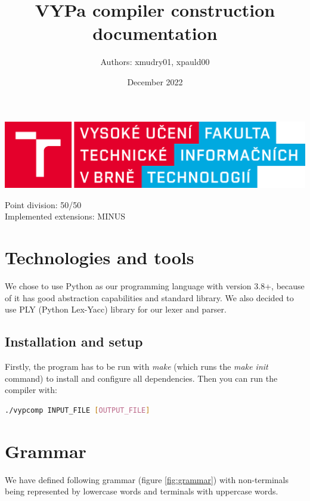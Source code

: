 \documentclass[12pt]{article}
\title{VYPa compiler construction documentation}
\author{Authors: xmudry01, xpauld00}
\date{December 2022}
\begin{document}
\null  %
\nointerlineskip  %
\begin{center}
    \includegraphics[scale=0.1]{images/fit_logo.png}
\end{center}
\vfill
\let\snewpage \newpage
\let\newpage \relax
\maketitle
\begin{center}
Point division: 50/50\\
Implemented extensions: MINUS    
\end{center}
\let \newpage \snewpage
\vfill 
\break %

\section{Technologies and tools}

We chose to use Python as our programming language with version 3.8+, because of it has good abstraction capabilities and standard library. We also decided to use PLY (Python Lex-Yacc) library for our lexer and parser.

\subsection{Installation and setup}

Firstly, the program has to be run with \emph{make} (which runs the \emph{make init} command) to install and configure all dependencies. Then you can run the compiler with:
\\
\begin{lstlisting}[language=bash,basicstyle=\ttfamily\normalsize\bfseries]
./vypcomp INPUT_FILE [OUTPUT_FILE]
\end{lstlisting}


\section{Grammar}
We have defined following grammar (figure \ref{fig:grammar}) with non-terminals being represented by lowercase words and terminals with uppercase words. 
\end{document}
